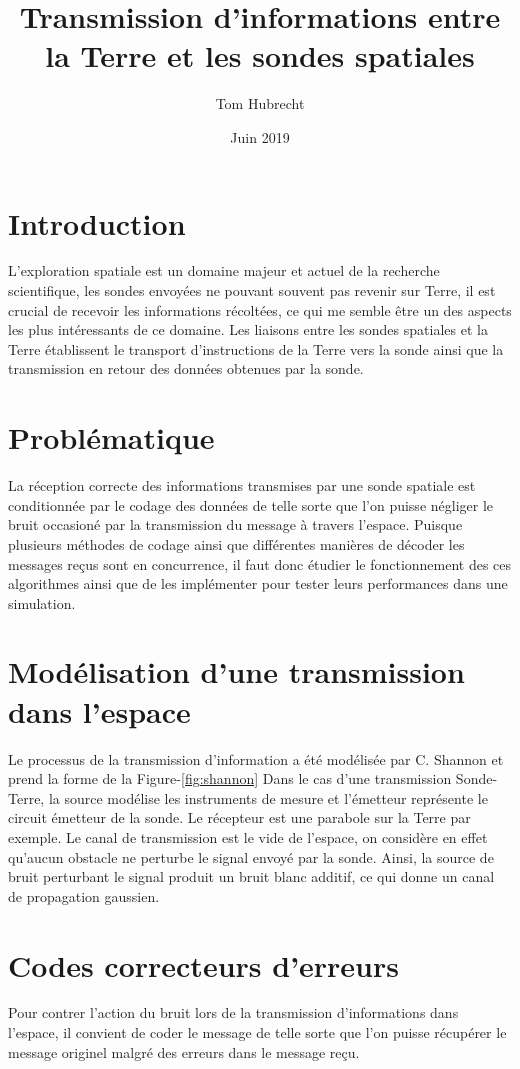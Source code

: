 \documentclass[12pt]{article}
\author{Tom Hubrecht}
\title{Transmission d'informations entre la Terre et les sondes spatiales}
\date{Juin 2019}
\begin{document}
\maketitle


\section{Introduction}
L'exploration spatiale est un domaine majeur et actuel de la recherche scientifique, les sondes envoyées ne pouvant souvent pas revenir sur Terre, il est crucial de recevoir les informations récoltées, ce qui me semble être un des aspects les plus intéressants de ce domaine. Les liaisons entre les sondes spatiales et la Terre établissent le transport d'instructions de la Terre vers la sonde ainsi que la transmission en retour des données obtenues par la sonde.


\section{Probl\'ematique}
La r\'eception correcte des informations transmises par une sonde spatiale est conditionn\'ee par le codage des donn\'ees de telle sorte que l'on puisse n\'egliger le bruit occasion\'e par la transmission du message \`a travers l'espace. Puisque plusieurs m\'ethodes de codage ainsi que diff\'erentes mani\`eres de d\'ecoder les messages re\c{c}us sont en concurrence, il faut donc \'etudier le fonctionnement des ces algorithmes ainsi que de les impl\'ementer pour tester leurs performances dans une simulation.


\section{Mod\'elisation d'une transmission dans l'espace}
Le processus de la transmission d'information a \'et\'e mod\'elis\'ee par C. Shannon et prend la forme de la Figure-\ref{fig:shannon}
Dans le cas d'une transmission Sonde-Terre, la source mod\'elise les instruments de mesure et l'\'emetteur repr\'esente le circuit \'emetteur de la sonde. Le r\'ecepteur est une parabole sur la Terre par exemple. Le canal de transmission est le vide de l'espace, on consid\`ere en effet qu'aucun obstacle ne perturbe le signal envoy\'e par la sonde. Ainsi, la source de bruit perturbant le signal produit un bruit blanc additif, ce qui donne un canal de propagation gaussien.


\section{Codes correcteurs d'erreurs}
Pour contrer l'action du bruit lors de la transmission d'informations dans l'espace, il convient de coder le message de telle sorte que l'on puisse r\'ecup\'erer le message originel malgr\'e des erreurs dans le message re\c{c}u.
\end{document}
